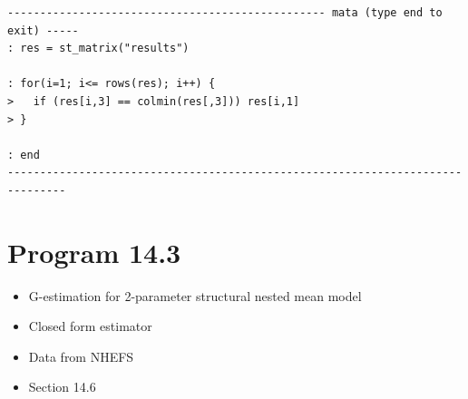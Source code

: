 \documentclass[
  10pt,
]{book}
\providecommand{\tightlist}{%
  \setlength{\itemsep}{0pt}\setlength{\parskip}{0pt}}
\begin{document}
\begin{verbatim}
------------------------------------------------- mata (type end to exit) -----
: res = st_matrix("results")

: for(i=1; i<= rows(res); i++) { 
>   if (res[i,3] == colmin(res[,3])) res[i,1]
> }

: end
-------------------------------------------------------------------------------
\end{verbatim}

\hypertarget{program-14.3}{%
\section{Program 14.3}\label{program-14.3}}

\begin{itemize}
\tightlist
\item
  G-estimation for 2-parameter structural nested mean model
\item
  Closed form estimator
\item
  Data from NHEFS
\item
  Section 14.6
\end{itemize}
\end{document}
